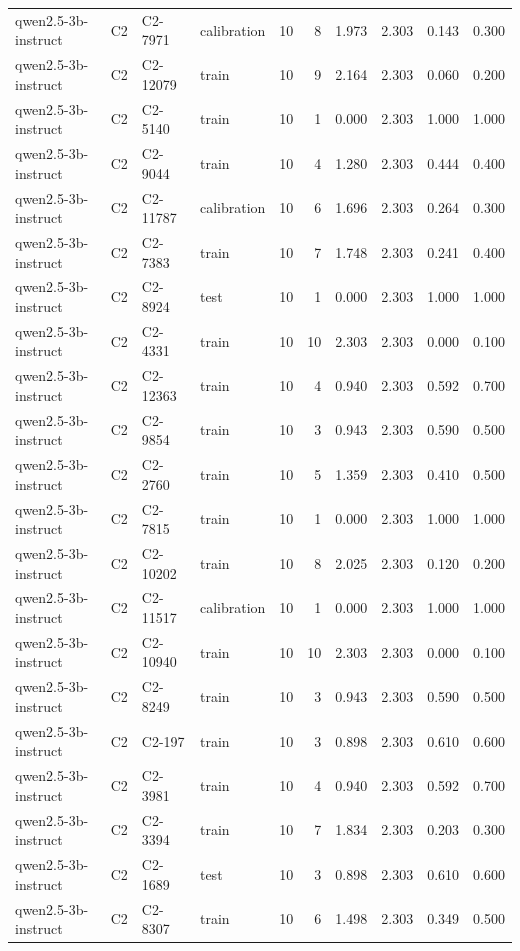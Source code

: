 \begin{table}
\begin{tabular}{llllrrrrrr}
qwen2.5-3b-instruct & C2 & C2-7971 & calibration & 10 & 8 & 1.973 & 2.303 & 0.143 & 0.300 \\
qwen2.5-3b-instruct & C2 & C2-12079 & train & 10 & 9 & 2.164 & 2.303 & 0.060 & 0.200 \\
qwen2.5-3b-instruct & C2 & C2-5140 & train & 10 & 1 & 0.000 & 2.303 & 1.000 & 1.000 \\
qwen2.5-3b-instruct & C2 & C2-9044 & train & 10 & 4 & 1.280 & 2.303 & 0.444 & 0.400 \\
qwen2.5-3b-instruct & C2 & C2-11787 & calibration & 10 & 6 & 1.696 & 2.303 & 0.264 & 0.300 \\
qwen2.5-3b-instruct & C2 & C2-7383 & train & 10 & 7 & 1.748 & 2.303 & 0.241 & 0.400 \\
qwen2.5-3b-instruct & C2 & C2-8924 & test & 10 & 1 & 0.000 & 2.303 & 1.000 & 1.000 \\
qwen2.5-3b-instruct & C2 & C2-4331 & train & 10 & 10 & 2.303 & 2.303 & 0.000 & 0.100 \\
qwen2.5-3b-instruct & C2 & C2-12363 & train & 10 & 4 & 0.940 & 2.303 & 0.592 & 0.700 \\
qwen2.5-3b-instruct & C2 & C2-9854 & train & 10 & 3 & 0.943 & 2.303 & 0.590 & 0.500 \\
qwen2.5-3b-instruct & C2 & C2-2760 & train & 10 & 5 & 1.359 & 2.303 & 0.410 & 0.500 \\
qwen2.5-3b-instruct & C2 & C2-7815 & train & 10 & 1 & 0.000 & 2.303 & 1.000 & 1.000 \\
qwen2.5-3b-instruct & C2 & C2-10202 & train & 10 & 8 & 2.025 & 2.303 & 0.120 & 0.200 \\
qwen2.5-3b-instruct & C2 & C2-11517 & calibration & 10 & 1 & 0.000 & 2.303 & 1.000 & 1.000 \\
qwen2.5-3b-instruct & C2 & C2-10940 & train & 10 & 10 & 2.303 & 2.303 & 0.000 & 0.100 \\
qwen2.5-3b-instruct & C2 & C2-8249 & train & 10 & 3 & 0.943 & 2.303 & 0.590 & 0.500 \\
qwen2.5-3b-instruct & C2 & C2-197 & train & 10 & 3 & 0.898 & 2.303 & 0.610 & 0.600 \\
qwen2.5-3b-instruct & C2 & C2-3981 & train & 10 & 4 & 0.940 & 2.303 & 0.592 & 0.700 \\
qwen2.5-3b-instruct & C2 & C2-3394 & train & 10 & 7 & 1.834 & 2.303 & 0.203 & 0.300 \\
qwen2.5-3b-instruct & C2 & C2-1689 & test & 10 & 3 & 0.898 & 2.303 & 0.610 & 0.600 \\
qwen2.5-3b-instruct & C2 & C2-8307 & train & 10 & 6 & 1.498 & 2.303 & 0.349 & 0.500 \\

\end{tabular}
\end{table}
